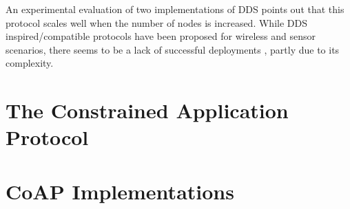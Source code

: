 An experimental evaluation of two implementations of DDS \cite{4536566} points out that this protocol scales well when the number of nodes is increased. While DDS inspired/compatible protocols have been proposed for wireless and sensor scenarios, there seems to be a lack of successful deployments \cite{7396558}, partly due to its complexity. 


\section{The Constrained Application Protocol} \label{CoAP_intro}

\section{CoAP Implementations} \label{CoAP_imp}